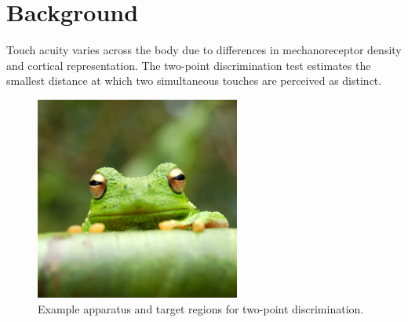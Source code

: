 \section{Background}
Touch acuity varies across the body due to differences in mechanoreceptor density and cortical representation. The two-point discrimination test estimates the smallest distance at which two simultaneous touches are perceived as distinct.

\begin{figure}[H]
  \centering
  \includegraphics[width=0.6\textwidth]{labs/unit2_two-point/figures/sample.jpg}
  \caption{Example apparatus and target regions for two-point discrimination.}
  \label{fig:tactile-map}
\end{figure}
